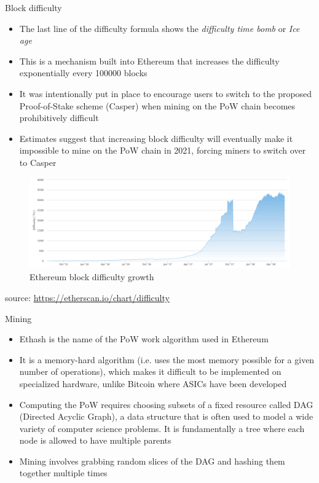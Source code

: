 \documentclass[10pt]{beamer}
\begin{document}
\begin{frame}{Block difficulty}
	\begin{itemize}
		\item The last line of the difficulty formula shows the \textit{difficulty time bomb} or \textit{Ice age}
		\item This is a mechanism built into Ethereum that increases the difficulty exponentially every 100000 blocks
		\item It was intentionally put in place to encourage users to switch to the proposed Proof-of-Stake scheme (Casper) when mining on the PoW chain becomes prohibitively difficult
		\item Estimates suggest that increasing block difficulty will eventually make it impossible to mine on the PoW chain in 2021, forcing miners to switch over to Casper
	\end{itemize}
\end{frame}


\begin{frame}
	\begin{figure}[]
		\centering
		\includegraphics  [scale=0.25]{Images/eth-difficulty}
		\caption{Ethereum block difficulty growth}
	\end{figure}
	\begin{scriptsize}
		source: \href{https://etherscan.io/chart/difficulty}{https://etherscan.io/chart/difficulty}
	\end{scriptsize}
\end{frame}


\begin{frame}{Mining}
	\begin{itemize}
		\item Ethash is the name of the PoW work algorithm used in Ethereum
		\item It is a memory-hard algorithm (i.e. uses the most memory possible for a given number of operations), which makes it difficult to be implemented on specialized hardware, unlike Bitcoin where ASICs have been developed
		\item Computing the PoW requires choosing subsets of a fixed resource called DAG (Directed Acyclic Graph), a data structure that is often used to model a wide variety of computer science problems. It is fundamentally a tree where each node is allowed to have multiple parents
		\item Mining involves grabbing random slices of the DAG and hashing them together multiple times
	\end{itemize}
\end{frame}
\end{document}
